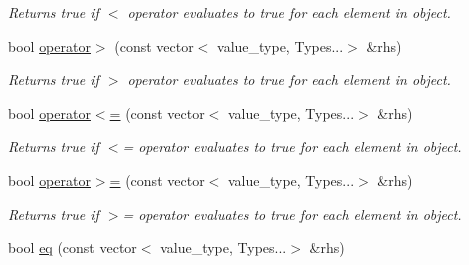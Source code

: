 \begin{DoxyCompactItemize}
\begin{DoxyCompactList}\small\item\em Returns true if $<$ operator evaluates to true for each element in object. \end{DoxyCompactList}\item 
\hypertarget{classheterogeneous_1_1vector_3_01_t_00_01_types_8_8_8_4_aa168a2954f85e0c5fbb67c45d13c3f56}{}bool \hyperlink{classheterogeneous_1_1vector_3_01_t_00_01_types_8_8_8_4_aa168a2954f85e0c5fbb67c45d13c3f56}{operator$>$} (const vector$<$ value\+\_\+type, Types...$>$ \&rhs)\label{classheterogeneous_1_1vector_3_01_t_00_01_types_8_8_8_4_aa168a2954f85e0c5fbb67c45d13c3f56}

\begin{DoxyCompactList}\small\item\em Returns true if $>$ operator evaluates to true for each element in object. \end{DoxyCompactList}\item 
\hypertarget{classheterogeneous_1_1vector_3_01_t_00_01_types_8_8_8_4_a7b69b25437440fdd8f76e575fadd06fa}{}bool \hyperlink{classheterogeneous_1_1vector_3_01_t_00_01_types_8_8_8_4_a7b69b25437440fdd8f76e575fadd06fa}{operator$<$=} (const vector$<$ value\+\_\+type, Types...$>$ \&rhs)\label{classheterogeneous_1_1vector_3_01_t_00_01_types_8_8_8_4_a7b69b25437440fdd8f76e575fadd06fa}

\begin{DoxyCompactList}\small\item\em Returns true if $<$= operator evaluates to true for each element in object. \end{DoxyCompactList}\item 
\hypertarget{classheterogeneous_1_1vector_3_01_t_00_01_types_8_8_8_4_a49b6e5cbbb934aa63fc84f23ba704cb9}{}bool \hyperlink{classheterogeneous_1_1vector_3_01_t_00_01_types_8_8_8_4_a49b6e5cbbb934aa63fc84f23ba704cb9}{operator$>$=} (const vector$<$ value\+\_\+type, Types...$>$ \&rhs)\label{classheterogeneous_1_1vector_3_01_t_00_01_types_8_8_8_4_a49b6e5cbbb934aa63fc84f23ba704cb9}

\begin{DoxyCompactList}\small\item\em Returns true if $>$= operator evaluates to true for each element in object. \end{DoxyCompactList}\item 
\hypertarget{classheterogeneous_1_1vector_3_01_t_00_01_types_8_8_8_4_a7dd6e6d858c4e8ab83a5af84064e67f0}{}bool \hyperlink{classheterogeneous_1_1vector_3_01_t_00_01_types_8_8_8_4_a7dd6e6d858c4e8ab83a5af84064e67f0}{eq} (const vector$<$ value\+\_\+type, Types...$>$ \&rhs)\label{classheterogeneous_1_1vector_3_01_t_00_01_types_8_8_8_4_a7dd6e6d858c4e8ab83a5af84064e67f0}


\end{DoxyCompactItemize}

